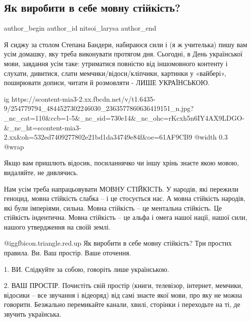  
 
 
 
 
 
\subsection{Як виробити в себе мовну стійкість?}
\label{sec:09_11_2021.fb.nitsoi_larysa.1.movna_stijkistj}
 
\ifcmt
 author_begin
   author_id nitsoi_larysa
 author_end
\fi

Я сиджу за столом Степана Бандери, набираюся сили і (я ж учителька) пишу вам
усім домашку, яку треба виконувати протягом дня. Сьогодні, в День української
мови, завдання усім таке: утриматися повністю від іншомовного контенту і
слухати, дивитися, слати мемчики/відоси/кліпчики, картинки у «вайбері»,
поширювати дописи, читати й розмовляти - ЛИШЕ УКРАЇНСЬКОЮ. 

\ifcmt
  ig https://scontent-mia3-2.xx.fbcdn.net/v/t1.6435-9/254779794_4844527302246030_2363577860636419151_n.jpg?_nc_cat=110&ccb=1-5&_nc_sid=730e14&_nc_ohc=rKcxh5n6IY4AX9LDGO-&_nc_ht=scontent-mia3-2.xx&oh=532ed7409277802e21bd1da34749e84f&oe=61AF9CB9
  @width 0.3
  @wrap 
\fi

Якщо вам пришлють відосик, посиланнячко чи іншу хрінь знаєте якою мовою,
видаляйте, не дивлячись. 

Нам усім треба напрацьовувати МОВНУ СТІЙКІСТЬ. У народів, які пережили геноцид,
мовна стійкість слабка – і це стосується нас. А мовна стійкість народів, які
були імперіями, сильна. Мовна стійкість – це ментальна стійкість. Це стійкість
індентична. Мовна стійкість – це альфа і омега нашої нації, нашої сили, нашого
утвердження на своїй землі. 

 @igg{fbicon.triangle.red.up} Як виробити в себе мовну стійкість? Три простих правила. Ви. Ваш простір.
Ваше оточення.

1. ВИ. Слідкуйте за собою, говоріть лише українською.

2. ВАШ ПРОСТІР. Почистіть свій простір (книги, телевізор, інтернет, мемчики,
відосики – все звучання і відеоряд) від самі знаєте якої мови, про яку не можна
говорити. Безжально перемикайте канали, хвилі, сторінки і переходьте на ті, де
звучить українська. 

